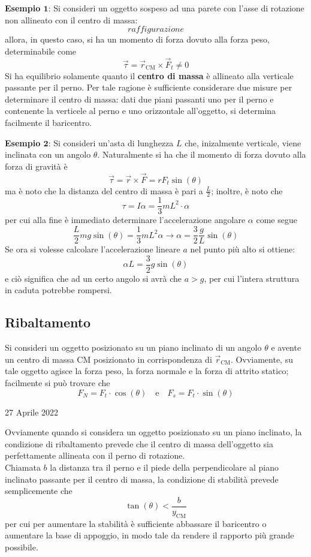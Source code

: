 \documentclass[a4paper]{extarticle}
\begin{document}
\vspace{1em}
\noindent
\textbf{Esempio $\boldsymbol{1}$}: Si consideri un oggetto sospeso ad una parete con l'asse di rotazione non allineato con il centro di massa:
\[raffigurazione\]
allora, in questo caso, si ha un momento di forza dovuto alla forza peso, determinabile come
\[\vec \tau = \vec r_{\text{CM}} \times \vec F_{t} \neq 0\]
Si ha equilibrio solamente quanto il \textbf{centro di massa} è allineato alla verticale passante per il perno. Per tale ragione è sufficiente considerare due misure per determinare il centro di massa: dati due piani passanti uno per il perno e contenente la verticele al perno e uno orizzontale all'oggetto, si determina facilmente il baricentro.

\vspace{1em}
\noindent
\textbf{Esempio $\boldsymbol{2}$}: Si consideri un'asta di lunghezza $L$ che, inizalmente verticale, viene inclinata con un angolo $\theta$. Naturalmente si ha che il momento di forza dovuto alla forza di gravità è
\[\vec \tau = \vec r \times \vec F = r F_t \sin(\theta)\]
ma è noto che la distanza del centro di massa è pari a $\frac{L}{2}$; inoltre, è noto che
\[\tau=I \alpha = \frac{1}{3}mL^2 \cdot \alpha\]
per cui alla fine è immediato determinare l'accelerazione angolare $\alpha$ come segue
\[\frac{L}{2}mg \sin(\theta)=\frac{1}{3} mL^2 \alpha \longrightarrow \alpha = \frac{3}{2}\frac{g}{L} \sin(\theta)\]
Se ora si volesse calcolare l'accelerazione lineare $a$ nel punto più alto si ottiene:
\[\alpha L = \frac{3}{2}g \sin(\theta)\]
e ciò significa che ad un certo angolo si avrà che $a > g$, per cui l'intera struttura in caduta potrebbe rompersi.

\vspace{1em}
\subsection{Ribaltamento}
Si consideri un oggetto posizionato su un piano inclinato di un angolo $\theta$ e avente un centro di massa CM posizionato in corrispondenza di $\vec r_{\text{CM}}$. Ovviamente, su tale oggetto agisce la forza peso, la forza normale e la forza di attrito statico; facilmente si può trovare che
\[F_N=F_t \cdot \cos(\theta) \hspace{1em} \text{e} \hspace{1em} F_s=F_t \cdot \sin(\theta)\]

\newpage
\noindent
\begin{center}
  27 Aprile 2022
\end{center}
Ovviamente quando si considera un oggetto posizionato su un piano inclinato, la condizione di ribaltamento prevede che il centro di massa dell'oggetto sia perfettamente allineata con il perno di rotazione.\\
Chiamata $b$ la distanza tra il perno e il piede della perpendicolare al piano inclinato passante per il centro di massa, la condizione di stabilità prevede semplicemente che
\[\boxed{\tan(\theta) < \frac{b}{y_{\text{CM}}}}\]
per cui per aumentare la stabilità è sufficiente abbassare il baricentro o aumentare la base di appoggio, in modo tale da rendere il rapporto più grande possibile.
\end{document}
